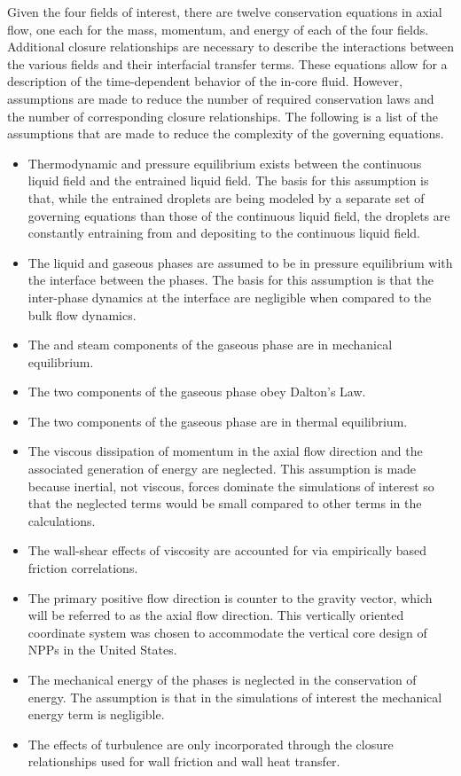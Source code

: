 Given the four fields of interest, there are twelve conservation equations in axial flow, one each for the mass, momentum, and energy of each of the four fields.
Additional closure relationships are necessary to describe the interactions between the various fields and their interfacial transfer terms.
These equations allow for a description of the time-dependent behavior of the in-core fluid.
However, assumptions are made to reduce the number of required conservation laws and the number of corresponding closure relationships.
The following is a list of the assumptions that are made to reduce the complexity of the governing equations.

\begin{itemize}
\item{
Thermodynamic and pressure equilibrium exists between the continuous liquid field and the entrained liquid field.
The basis for this assumption is that, while the entrained droplets are being modeled by a separate set of governing equations than those of the continuous liquid field, the droplets are constantly entraining from and depositing to the continuous liquid field. 
}
\item{
The liquid and gaseous phases are assumed to be in pressure equilibrium with the interface between the phases.
The basis for this assumption is that the inter-phase dynamics at the interface are negligible when compared to the bulk flow dynamics.
}
\item{The \ncg{} and steam components of the gaseous phase are in mechanical equilibrium.}
\item{The two components of the gaseous phase obey Dalton's Law.}
\item{The two components of the gaseous phase are in thermal equilibrium.}
\item{
The viscous dissipation of momentum in the axial flow direction and the associated generation of energy are neglected.
This assumption is made because inertial, not viscous, forces dominate the simulations of interest so that the neglected terms would be small compared to other terms in the calculations.
}
\item{
The wall-shear effects of viscosity are accounted for via empirically based friction correlations.
}
\item{
The primary positive flow direction is counter to the gravity vector, which will be referred to as the axial flow direction. This vertically oriented coordinate system was chosen to accommodate the vertical core design of NPPs in the United States.}
\item{
The mechanical energy of the phases is neglected in the conservation of energy. 
The assumption is that in the simulations of interest the mechanical energy term is negligible.
}
\item{
The effects of turbulence are only incorporated through the closure relationships used for wall friction and wall heat transfer.
}
\end{itemize}

